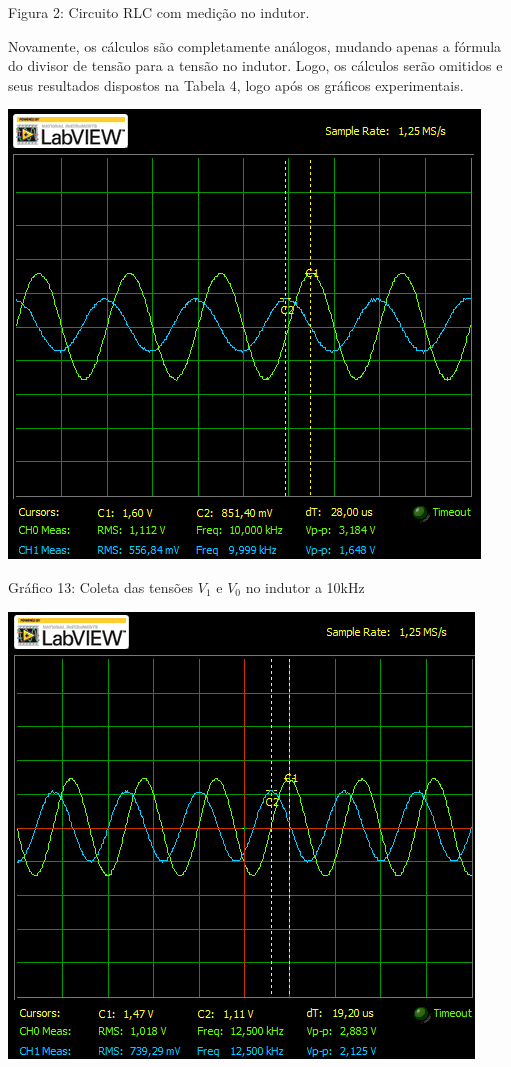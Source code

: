 \documentclass[a4 paper]{article}
\begin{document}
\begin{center}
Figura 2: Circuito RLC com medição no indutor.
\end{center}

Novamente, os cálculos são completamente análogos, mudando apenas a fórmula do divisor de tensão para a tensão no indutor. Logo, os cálculos serão omitidos e seus resultados dispostos na Tabela 4, logo após os gráficos experimentais.

	\newpage
	\begin{table}[h]
	\centering
	\includegraphics[scale=0.7]{graficos/circ3/rgadicoa3-2-10}
	\end{table}
	
	\begin{center}
	Gráfico 13: Coleta das tensões $V_1$ e $V_0$ no indutor a 10kHz
	\end{center}

	
	\begin{table}[h]
	\centering
	\includegraphics[scale=0.7]{graficos/circ3/rgadicoa3-2-12_5}
	\end{table}
	
\end{document}
